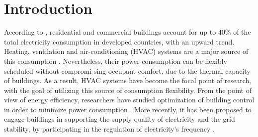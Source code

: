 
\section{Introduction}
\label{sec:Introduction}
According to \cite{Perez-Lombard:2008aa}, residential and commercial buildings account for up to 40\% of the total electricity consumption in developed countries, with an upward trend. Heating, ventilation and air-conditioning (HVAC) systems are a major source of this consumption \cite{USenergy:2017}. %
Nevertheless, their power consumption can be flexibly scheduled without compromi-sing occupant comfort, due to the thermal capacity of buildings. As a result, HVAC systems have become the focal point of research, with the goal of utilizing this source of consumption flexibility. From the point of view of energy efficiency, researchers have studied optimization of building control in order to minimize power consumption \cite{Siroky:2011aa, Parisio:2014aa}.  %
More recently, it has been proposed to engage buildings in supporting the supply quality of electricity and the grid stability, by participating in the regulation of electricity's frequency \cite{Balandat:2014contractdesign, Lin:2015exp, Vrettos:2014aggregation, Baccino:2014aa}.



